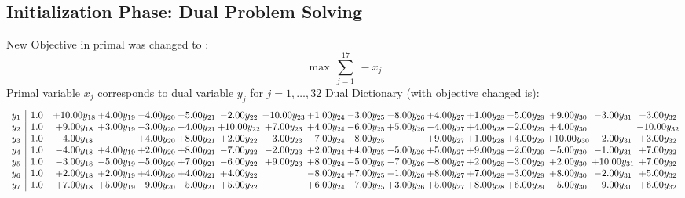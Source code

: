 \documentclass[9pt]{article}
\begin{document}
\subsection{Initialization Phase: Dual Problem Solving}
New Objective in primal was changed to : \[ \max\ \sum_{j=1}^{17}\ - x_j \] 
Primal variable $x_j$ corresponds to dual variable $y_j$ for $j = 1,\ldots,32$
Dual Dictionary (with objective changed is): 
\[\begin{array}{c| c c@{\hskip 2pt} c@{\hskip 2pt} c@{\hskip 2pt} c@{\hskip 2pt} c@{\hskip 2pt} c@{\hskip 2pt} c@{\hskip 2pt} c@{\hskip 2pt} c@{\hskip 2pt} c@{\hskip 2pt} c@{\hskip 2pt} c@{\hskip 2pt} c@{\hskip 2pt} c@{\hskip 2pt} c@{\hskip 2pt} }
 y_{1}   &  1.0 & + 10.00 y_{18} & +  4.00 y_{19} & -4.00 y_{20} & -5.00 y_{21} & -2.00 y_{22} & + 10.00 y_{23} & +  1.00 y_{24} & -3.00 y_{25} & -8.00 y_{26} & +  4.00 y_{27} & +  1.00 y_{28} & -5.00 y_{29} & +  9.00 y_{30} & -3.00 y_{31} & -3.00 y_{32}\\
 y_{2}   &  1.0 & +  9.00 y_{18} & +  3.00 y_{19} & -3.00 y_{20} & -4.00 y_{21} & + 10.00 y_{22} & +  7.00 y_{23} & +  4.00 y_{24} & -6.00 y_{25} & +  5.00 y_{26} & -4.00 y_{27} & +  4.00 y_{28} & -2.00 y_{29} & +  4.00 y_{30} &   & -10.00 y_{32}\\
 y_{3}   &  1.0 & -4.00 y_{18} &   & +  4.00 y_{20} & +  8.00 y_{21} & +  2.00 y_{22} & -3.00 y_{23} & -7.00 y_{24} & -8.00 y_{25} &   & +  9.00 y_{27} & +  1.00 y_{28} & +  4.00 y_{29} & + 10.00 y_{30} & -2.00 y_{31} & +  3.00 y_{32}\\
 y_{4}   &  1.0 & -4.00 y_{18} & +  4.00 y_{19} & +  2.00 y_{20} & +  8.00 y_{21} & -7.00 y_{22} & -2.00 y_{23} & +  2.00 y_{24} & +  4.00 y_{25} & -5.00 y_{26} & +  5.00 y_{27} & +  9.00 y_{28} & -2.00 y_{29} & -5.00 y_{30} & -1.00 y_{31} & +  7.00 y_{32}\\
 y_{5}   &  1.0 & -3.00 y_{18} & -5.00 y_{19} & -5.00 y_{20} & +  7.00 y_{21} & -6.00 y_{22} & +  9.00 y_{23} & +  8.00 y_{24} & -5.00 y_{25} & -7.00 y_{26} & -8.00 y_{27} & +  2.00 y_{28} & -3.00 y_{29} & +  2.00 y_{30} & + 10.00 y_{31} & +  7.00 y_{32}\\
 y_{6}   &  1.0 & +  2.00 y_{18} & +  2.00 y_{19} & +  4.00 y_{20} & +  4.00 y_{21} & +  4.00 y_{22} &   & -8.00 y_{24} & +  7.00 y_{25} & -1.00 y_{26} & +  8.00 y_{27} & +  7.00 y_{28} & -3.00 y_{29} & +  8.00 y_{30} & -2.00 y_{31} & +  5.00 y_{32}\\
 y_{7}   &  1.0 & +  7.00 y_{18} & +  5.00 y_{19} & -9.00 y_{20} & -5.00 y_{21} & +  5.00 y_{22} &   & +  6.00 y_{24} & -7.00 y_{25} & +  3.00 y_{26} & +  5.00 y_{27} & +  8.00 y_{28} & +  6.00 y_{29} & -5.00 y_{30} & -9.00 y_{31} & +  6.00 y_{32}\\

\end{array}\]
\end{document}

